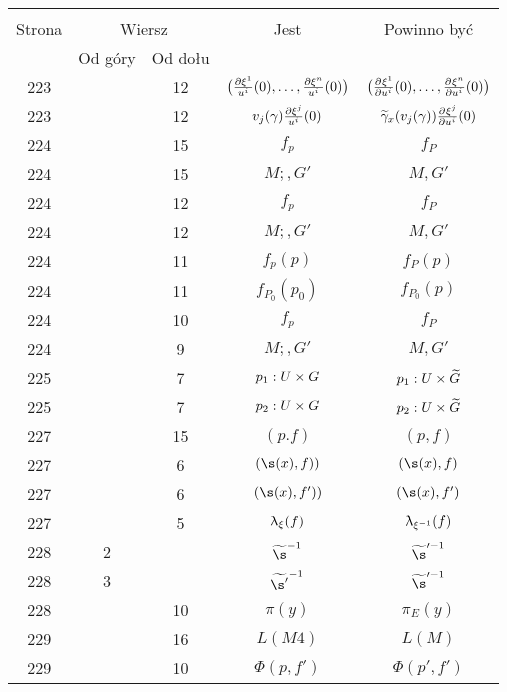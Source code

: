 \documentclass[a4paper,11pt]{article}
\begin{document}
\begin{center}
  \begin{tabular}{|c|c|c|c|c|}
    \hline
    & \multicolumn{2}{c|}{} & & \\
    Strona & \multicolumn{2}{c|}{Wiersz} & Jest
                              & Powinno być \\ \cline{2-3}
    & Od góry & Od dołu & & \\
    \hline
    223 & & 12 & $\big( \frac{ \partial \xi^{ 1 } }{ u^{ i } }( 0 ), \ldots,
                 \frac{ \partial \xi^{ n } }{ u^{ i } }( 0 ) \big)$
           & $\big( \frac{ \partial^{  } {  { \xi^{ 1 } }  } }{ \partial {  { u^{ i } }  }^{  } }( 0 ), \ldots,
             \frac{ \partial^{  } {  { \xi^{ n } }  } }{ \partial {  { u^{ i } }  }^{  } }( 0 ) \big)$ \\
    223 & & 12 & $v_{ j }( \gamma ) \frac{ \partial \xi ^{ j } }{ u^{ i } }( 0 )$
           & $\widetilde{ \gamma }_{ x }( v_{ j }( \gamma ) )
             \frac{ \partial^{  } {  { \xi ^{ j } }  } }{ \partial {  { u^{ i } }  }^{  } }( 0 )$ \\
    224 & & 15 & $f_{ p }$ & $f_{ P }$ \\
    224 & & 15 & $M;, G'$ & $M, G'$ \\
    224 & & 12 & $f_{ p }$ & $f_{ P }$ \\
    224 & & 12 & $M;, G'$ & $M, G'$ \\
    224 & & 11 & $f_{ p }( p )$ & $f_{ P }( p )$ \\
    224 & & 11 & $f_{ P_{ 0 } }( p_{ 0 } )$ & $f_{ P_{ 0 } }( p )$ \\
    224 & & 10 & $f_{ p }$ & $f_{ P }$ \\
    224 & &  9 & $M;, G'$ & $M, G'$ \\
    225 & &  7 & $p_{ 1 } : U \times G$ & $p_{ 1 } : U \times \widetilde{ G }$ \\
    225 & &  7 & $p_{ 2 } : U \times G$ & $p_{ 2 } : U \times \widetilde{ G }$ \\
    227 & & 15 & $( p. f )$ & $( p, f )$ \\
    227 & &  6 & $( \s( x ), f ) )$ & $( \s( x ), f )$ \\
    227 & &  6 & $( \s( x ), f' ) )$ & $( \s( x ), f' )$ \\
    227 & &  5 & $\uplambda_{ \xi }( f )$ & $\uplambda_{ \xi^{ -1 } }( f )$ \\
    228 &  2 & & $\wt{ \s }^{ -1 }$ & $\wt{ \s }'^{ -1 }$ \\
    228 &  3 & & $\wt{ \s' }^{ -1 }$ & $\wt{ \s }'^{ -1 }$ \\
    228 & & 10 & $\pi( y )$ & $\pi_{ E }( y )$ \\
    229 & & 16 & $L( M 4 )$ & $L( M )$ \\
    229 & & 10 & $\Phi( p, f' )$ & $\Phi( p', f' )$ \\

\end{tabular}
\end{center}
\end{document}
